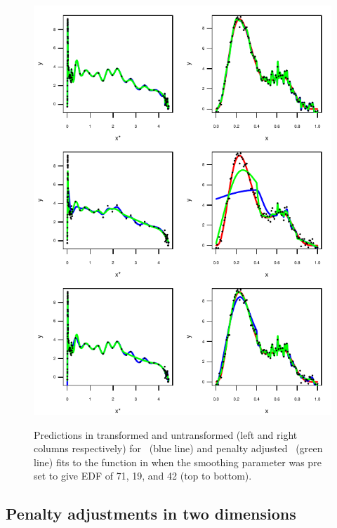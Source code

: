 \begin{figure}
\centering
\includegraphics[width=5.5in]{mds/figs/1dedfdia.pdf} \\
\caption{Predictions in transformed and untransformed (left and right columns respectively) for \tprs\ (blue line) and penalty adjusted \tprs\ (green line) fits to the function in  when the smoothing parameter was pre set to give EDF of 71, 19, and 42 (top to bottom).}
\label{1dedfdia}
\end{figure}


\subsection{Penalty adjustments in two dimensions}

